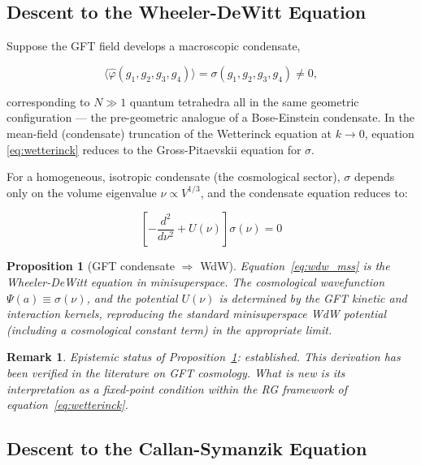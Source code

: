 \documentclass[12pt,a4paper]{article}
\newtheorem{proposition}{Proposition}
\newtheorem{remark}{Remark}
\begin{document}
\subsection{Descent to the Wheeler-DeWitt Equation}
\label{sec:wdw}

Suppose the GFT field develops a macroscopic condensate,

\begin{equation}
\label{eq:condensate}
\langle\hat\varphi(g_1,g_2,g_3,g_4)\rangle = \sigma(g_1,g_2,g_3,g_4) \neq 0,
\end{equation}

corresponding to $N\gg 1$ quantum tetrahedra all in the same geometric
configuration — the pre-geometric analogue of a Bose-Einstein condensate.
In the mean-field (condensate) truncation of the Wetterinck equation
at $k\to 0$, equation \eqref{eq:wetterinck} reduces to the
Gross-Pitaevskii equation for $\sigma$.

For a homogeneous, isotropic condensate (the cosmological sector),
$\sigma$ depends only on the volume eigenvalue $\nu \propto V^{1/3}$,
and the condensate equation reduces to:

\begin{equation}
\label{eq:wdw_mss}
\boxed{
\left[-\frac{d^2}{d\nu^2} + U(\nu)\right]\sigma(\nu) = 0
}
\end{equation}

\begin{proposition}[GFT condensate $\Rightarrow$ WdW]
\label{prop:wdw}
Equation~\eqref{eq:wdw_mss} is the Wheeler-DeWitt equation in
minisuperspace.
The cosmological wavefunction $\Psi(a) \equiv \sigma(\nu)$, and the
potential $U(\nu)$ is determined by the GFT kinetic and interaction
kernels, reproducing the standard minisuperspace WdW potential
(including a cosmological constant term) in the appropriate limit.
\end{proposition}

\begin{remark}
\emph{Epistemic status of Proposition~\ref{prop:wdw}: established.}
This derivation has been verified in the literature on GFT cosmology.
What is new is its interpretation as a fixed-point condition within
the RG framework of equation~\eqref{eq:wetterinck}.
\end{remark}

\subsection{Descent to the Callan-Symanzik Equation}
\label{sec:cs}
\end{document}
